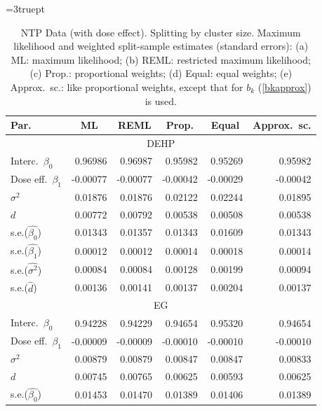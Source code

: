 \documentclass[11pt,a5paper,twoside]{book}
\begin{document}
\begin{table}[!t]
\begin{center}
\caption[NTP Data (with dose effect)]{\linespread{1} \small NTP Data (with dose effect). Splitting by cluster size.  Maximum likelihood and weighted split-sample estimates (standard errors): (a) ML: maximum likelihood; (b) REML: restricted maximum likelihood; (c) Prop.: proportional weights; (d) Equal: equal weights; (e) Approx.~sc.: like proportional weights, except that for $b_k$ (\ref{bkapprox}) is used.\label{ntpestimatestable3}}


\vspace*{2mm}
\def\arraystretch{0.55}\small\tabcolsep=3truept \begin{tabular}{lrrrrr}
\hline\hline
 Par.& \multicolumn{1}{c}{ML}& \multicolumn{1}{c}{REML}& \multicolumn{1}{c}{Prop.}& \multicolumn{1}{c}{Equal}       & \multicolumn{1}{c}{Approx.~sc.}\\
\hline
\hline
\multicolumn{6}{c}{{DEHP}}\\
\hline
Interc.\ $\beta_0$ & 0.96986 & 0.96987 & 0.95982 & 0.95269 & 0.95982 \\
  Dose eff.\ $\beta_1$ & -0.00077 & -0.00077 & -0.00042 & -0.00029 & -0.00042 \\
 $\sigma^2$ & 0.01876 & 0.01876 & 0.02122 & 0.02244 & 0.01895 \\
  $d$& 0.00772 & 0.00792 & 0.00538 & 0.00508 & 0.00538 \\
\hline
s.e.($\widehat{\beta_0}$) & 0.01343 & 0.01357 & 0.01343 & 0.01609 & 0.01343 \\
s.e.($\widehat{\beta_1}$) & 0.00012 & 0.00012 & 0.00014 & 0.00018 & 0.00014 \\
s.e.($\widehat{\sigma^2}$) & 0.00084 & 0.00084 & 0.00128 & 0.00199 & 0.00094 \\
s.e.($\widehat{d}$) & 0.00136 & 0.00141 & 0.00137 & 0.00204 & 0.00137 \\
\hline\hline
\multicolumn{6}{c}{{EG}}\\
\hline
Interc.\ $\beta_0$& 0.94228 & 0.94229 & 0.94654 & 0.95320 & 0.94654 \\
 Dose eff.\ $\beta_1$ & -0.00009 & -0.00009 & -0.00010 & -0.00010 & -0.00010 \\
 $\sigma^2$ & 0.00879 & 0.00879 & 0.00847 & 0.00847 & 0.00833 \\
$d$ & 0.00745 & 0.00765 & 0.00625 & 0.00593 & 0.00625 \\
\hline
s.e.($\widehat{\beta_0}$) & 0.01453 & 0.01470 & 0.01389 & 0.01406 & 0.01389 \\

\end{tabular}
\end{center}
\end{table}
\end{document}
